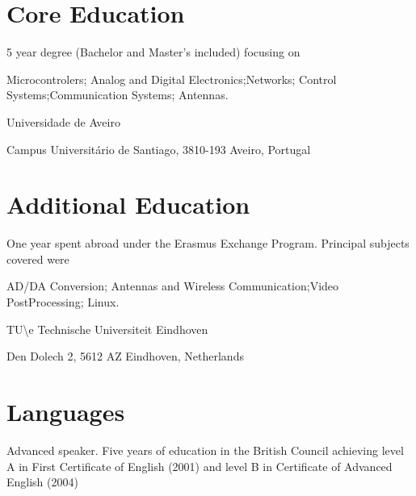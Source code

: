 \documentclass[a4paper,12pt]{article}
\begin{document}





\section*{Core Education}


{
5 year degree (Bachelor and Master's included) focusing on

Microcontrolers; Analog and Digital Electronics;Networks; Control
Systems;Communication Systems; Antennas.
}


{
Universidade de Aveiro

Campus Universitário de Santiago, 3810-193 Aveiro, Portugal
}

\section*{Additional Education}


{
One year spent abroad under the Erasmus Exchange
Program. Principal subjects covered were

AD/DA Conversion; Antennas and Wireless Communication;Video PostProcessing;
Linux.
}

{
TU\textbackslash e Technische Universiteit Eindhoven

Den Dolech 2, 5612 AZ Eindhoven, Netherlands
}

\section*{Languages}


{
Advanced speaker. Five years of education in the British Council achieving
level A in First Certificate of English (2001) and level B in Certificate of
Advanced English (2004)
}
\end{document}
